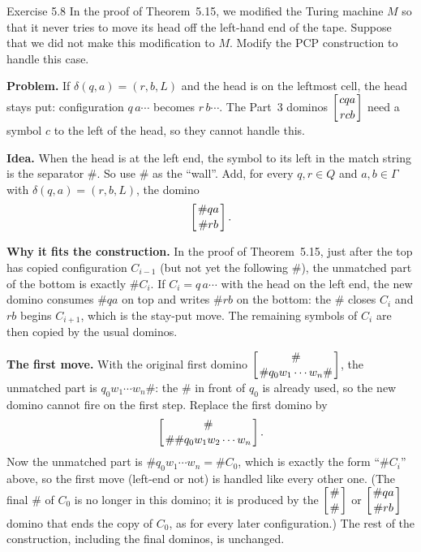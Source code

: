 \begin{question}{Exercise 5.8}
In the proof of Theorem~5.15, we modified the Turing machine $M$ so that it never tries to move its head off the left-hand end of the tape. Suppose that we did not make this modification to $M$. Modify the PCP construction to handle this case.
\end{question}
\begin{soln}
\textbf{Problem.} If $\delta(q,a)=(r,b,L)$ and the head is on the leftmost cell, the head stays put: configuration $q\,a\cdots$ becomes $r\,b\cdots$. The Part~3 dominos $\dom{cqa}{rcb}$ need a symbol $c$ to the left of the head, so they cannot handle this.

\textbf{Idea.} When the head is at the left end, the symbol to its left in the match string is the separator $\#$. So use $\#$ as the ``wall''. Add, for every $q,r\in Q$ and $a,b\in\Gamma$ with $\delta(q,a)=(r,b,L)$, the domino
\[
\dom{\#qa}{\#rb}.
\]

\textbf{Why it fits the construction.} In the proof of Theorem~5.15, just after the top has copied configuration $C_{i-1}$ (but not yet the following $\#$), the unmatched part of the bottom is exactly $\#C_i$. If $C_i=q\,a\cdots$ with the head on the left end, the new domino consumes $\#qa$ on top and writes $\#rb$ on the bottom: the $\#$ closes $C_i$ and $rb$ begins $C_{i+1}$, which is the stay-put move. The remaining symbols of $C_i$ are then copied by the usual dominos.

\textbf{The first move.} With the original first domino $\dom{\#}{\#q_0w_1\cdots w_n\#}$, the unmatched part is $q_0w_1\cdots w_n\#$: the $\#$ in front of $q_0$ is already used, so the new domino cannot fire on the first step. Replace the first domino by
\[
\dom{\#}{\#\#q_0w_1w_2\cdots w_n}.
\]
Now the unmatched part is $\#q_0w_1\cdots w_n=\#C_0$, which is exactly the form ``$\#C_i$'' above, so the first move (left-end or not) is handled like every other one. (The final $\#$ of $C_0$ is no longer in this domino; it is produced by the $\dom{\#}{\#}$ or $\dom{\#qa}{\#rb}$ domino that ends the copy of $C_0$, as for every later configuration.) The rest of the construction, including the final dominos, is unchanged.
\end{soln}

